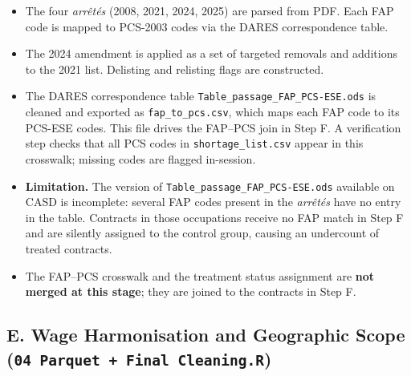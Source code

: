 \begin{itemize}
  \item The four \textit{arrêtés} (2008, 2021, 2024, 2025) are parsed from
  PDF. Each FAP code is mapped to PCS-2003 codes via the DARES
  correspondence table.
  \item The 2024 amendment is applied as a set of targeted removals and
  additions to the 2021 list. Delisting and relisting flags are constructed.
  \item The DARES correspondence table \texttt{Table\_passage\_FAP\_PCS-ESE.ods}
  is cleaned and exported as \texttt{fap\_to\_pcs.csv}, which maps each FAP
  code to its PCS-ESE codes. This file drives the FAP--PCS join in Step F.
  A verification step checks that all PCS codes in \texttt{shortage\_list.csv}
  appear in this crosswalk; missing codes are flagged in-session.
  \item \textbf{Limitation.} The version of \texttt{Table\_passage\_FAP\_PCS-ESE.ods}
  available on CASD is incomplete: several FAP codes present in the
  \textit{arrêtés} have no entry in the table. Contracts in those occupations
  receive no FAP match in Step F and are silently assigned to the control group,
  causing an undercount of treated contracts.
  \item The FAP--PCS crosswalk and the treatment status assignment are
  \textbf{not merged at this stage}; they are joined to the contracts
  in Step F.
\end{itemize}

\subsection*{E. Wage Harmonisation and Geographic Scope
\textnormal{\small(\texttt{04 Parquet + Final Cleaning.R})}}

